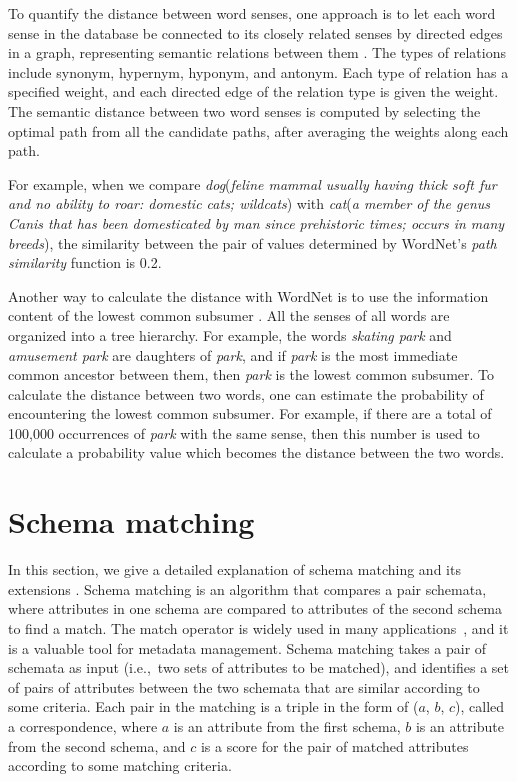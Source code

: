 To quantify the distance between word senses, one approach is to let each word sense in the database be connected to its closely related senses by directed edges in a graph, representing semantic relations between them \cite{cruz2005role}. The types of relations include synonym, hypernym, hyponym, and antonym. Each type of relation has a specified weight, and each directed edge of the relation type is given the weight. The semantic distance between two word senses is computed by selecting the optimal path from all the candidate paths, after averaging the weights along each path.

For example, when we compare \textit{dog}(\textit{feline mammal usually having thick soft fur and no ability to roar: domestic cats; wildcats}) with \textit{cat}(\textit{a member of the genus Canis that has been domesticated by man since prehistoric times; occurs in many breeds}), the similarity between the pair of values determined by WordNet's \textit{path similarity} function is 0.2.

Another way to calculate the distance with WordNet is to use the information content of the lowest common subsumer \cite{Resnik1970Using}. All the senses of all words are organized into a tree hierarchy. For example, the words \textit{skating park} and \textit{amusement park} are daughters of \textit{park}, and if \textit{park} is the most immediate common ancestor between them, then \textit{park} is the lowest common subsumer. To calculate the distance between two words, one can estimate the probability of encountering the lowest common subsumer. For example, if there are a total of 100,000 occurrences of \textit{park} with the same sense, then this number is used to calculate a probability value which becomes the distance between the two words.

\section{Schema matching}
\label{sec:SchemaMatching}

In this section, we give a detailed explanation of schema matching and its extensions \cite{Rahm2001Survey}. Schema matching is an algorithm that compares a pair schemata, where attributes in one schema are compared to attributes of the second schema to find a match. The match operator is widely used in many applications~\cite{Dong2012Proceedings,Rahm2001Survey,10.1145/3183713.3183729}, and it is a valuable tool for metadata management. Schema matching takes a pair of schemata as input (i.e.,~two sets of attributes to be matched), and identifies a set of pairs of attributes between the two schemata that are similar according to some criteria. Each pair in the matching is a triple in the form of ($a$, $b$, $c$), called a correspondence, where $a$ is an attribute from the first schema, $b$ is an attribute from the second schema, and $c$ is a score for the pair of matched attributes according to some matching criteria.


